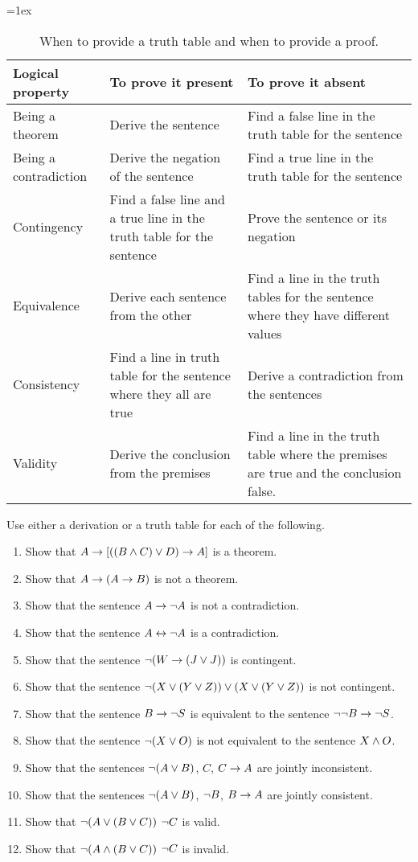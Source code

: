 \begin{table}\small
\tabulinesep=1ex
\begin{tabu}{X[.7,c,m] ||X[1,l,m] |X[1,l,m]}
\textbf{Logical property} 	&	\textbf{To prove it present} 	&	\textbf{To prove it absent} \\ \hline \hline
Being a theorem 		& Derive the sentence  						& Find a false line in the truth table for the sentence \\ \hline
Being a contradiction 	&  Derive the negation of the sentence  		 & Find a true line in the truth table for the sentence\\ \hline
Contingency 			& Find a false line and a true line in the truth table for the sentence & Prove the sentence or its negation\\ \hline
Equivalence 			& Derive each sentence from the other 		 & Find a line in the truth tables for the sentence where they have different values\\ \hline
Consistency 		& Find a line in truth table for the sentence where they all are true & Derive a contradiction from the sentences\\ \hline
Validity 				& Derive the conclusion from the premises & Find a line in the truth table where the premises are true and the conclusion false. \\ 
\end{tabu}
\caption{When to provide a truth table and when to provide a proof.}
\label{table.ProofOrModel}
\end{table}



\practiceproblems
\noindent\problempart Use either a derivation or a truth table for each of the following. 
\begin{enumerate}%
\item Show that $A \rightarrow [((B \wedge C) \vee D) \rightarrow A]$ is a theorem.
\item Show that $A \rightarrow (A \rightarrow B)$ is not a theorem.
\item Show that the sentence $A \rightarrow \neg{A}$ is not a contradiction.
\item Show that the sentence $A \leftrightarrow \neg A$ is a contradiction. 
\item Show that the sentence $ \neg (W \rightarrow (J \vee J)) $ is contingent.
\item Show that the sentence $ \neg(X \vee (Y \vee Z)) \vee (X \vee (Y \vee Z))$ is not contingent.
 \item Show that the sentence $B \rightarrow \neg S$ is equivalent to the sentence $\neg \neg B \rightarrow \neg S$.
\item Show that the sentence $ \neg (X \vee O) $ is not equivalent to the sentence $X \wedge O$.
\item Show that the sentences $\neg(A \vee B)$, $C$, $C \rightarrow A$  are jointly inconsistent.
\item Show that the sentences $\neg(A \vee B)$, $\neg{B}$, $B \rightarrow A$ are jointly consistent.
\item Show that $\neg(A \vee (B \vee C)) $ \therefore $ \neg{C}$ is valid.
\item Show that $\neg(A \wedge (B \vee C))$ \therefore $ \neg{C}$ is invalid. 
\end{enumerate}


